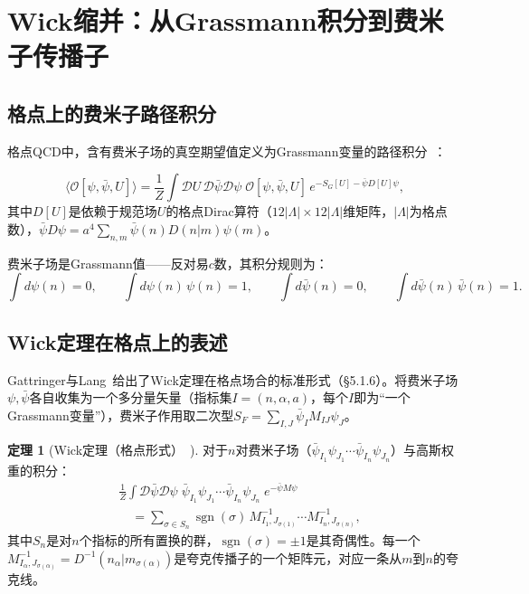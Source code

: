 \documentclass[12pt,a4paper]{ctexart}
\theoremstyle{definition}
\newtheorem{theorem}{定理}[section]
\begin{document}
\section{Wick缩并：从Grassmann积分到费米子传播子}

\subsection{格点上的费米子路径积分}

格点QCD中，含有费米子场的真空期望值定义为Grassmann变量的路径积分~\cite{GattringerLang2010}：

\begin{equation}
\langle \mathcal{O}[\psi,\bar\psi,U] \rangle = \frac{1}{Z}\int\mathcal{D}U\,\mathcal{D}\bar\psi\mathcal{D}\psi\; \mathcal{O}[\psi,\bar\psi,U]\,e^{-S_G[U] - \bar\psi D[U]\psi},
\label{eq:path_integral_fermions}
\end{equation}
其中$D[U]$是依赖于规范场$U$的格点Dirac算符（$12|\Lambda|\times 12|\Lambda|$维矩阵，$|\Lambda|$为格点数），$\bar\psi D\psi = a^4\sum_{n,m}\bar\psi(n)D(n|m)\psi(m)$。

费米子场是Grassmann值——反对易$c$数，其积分规则为：
\begin{equation}
\int d\psi(n) = 0,\qquad \int d\psi(n)\,\psi(n) = 1,\qquad \int d\bar\psi(n) = 0,\qquad \int d\bar\psi(n)\,\bar\psi(n) = 1.
\label{eq:grassmann_rules}
\end{equation}

\subsection{Wick定理在格点上的表述}

Gattringer与Lang~\cite{GattringerLang2010}给出了Wick定理在格点场合的标准形式（\S 5.1.6）。将费米子场$\psi,\bar\psi$各自收集为一个多分量矢量（指标集$I = (n,\alpha,a)$，每个$I$即为``一个Grassmann变量''），费米子作用取二次型$S_F = \sum_{I,J}\bar\psi_I M_{IJ}\psi_J$。

\begin{theorem}[Wick定理（格点形式）~\cite{GattringerLang2010}]
对于$n$对费米子场（$\bar\psi_{I_1}\psi_{J_1}\cdots\bar\psi_{I_n}\psi_{J_n}$）与高斯权重的积分：
\begin{equation}
\begin{aligned}
&\frac{1}{Z}\int\mathcal{D}\bar\psi\mathcal{D}\psi\; \bar\psi_{I_1}\psi_{J_1}\cdots\bar\psi_{I_n}\psi_{J_n}\; e^{-\bar\psi M\psi} \\
&\quad = \sum_{\sigma\in S_n}\operatorname{sgn}(\sigma)\,M^{-1}_{I_1,J_{\sigma(1)}}\cdots M^{-1}_{I_n,J_{\sigma(n)}},
\end{aligned}
\label{eq:wick_theorem_lattice}
\end{equation}
其中$S_n$是对$n$个指标的所有置换的群，$\operatorname{sgn}(\sigma)=\pm1$是其奇偶性。每一个$M^{-1}_{I_\alpha,J_{\sigma(\alpha)}} = D^{-1}(n_\alpha|m_{\sigma(\alpha)})$是夸克传播子的一个矩阵元，对应一条从$m$到$n$的夸克线。
\end{theorem}
\end{document}
